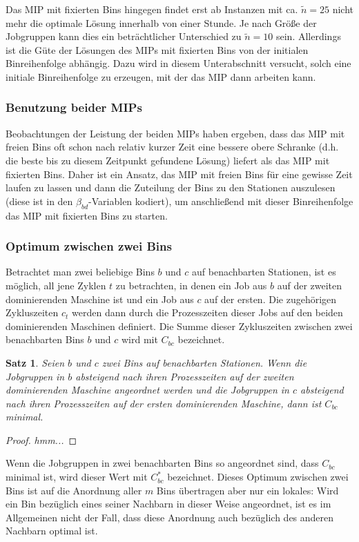 \documentclass{scrreprt}
\newtheorem{satz}{Satz}
\begin{document}
Das MIP mit fixierten Bins hingegen findet erst ab Instanzen mit ca. $\tilde{n}=25$ nicht mehr die optimale Lösung innerhalb von einer Stunde.
Je nach Größe der Jobgruppen kann dies ein beträchtlicher Unterschied zu $\tilde{n}=10$ sein. 
Allerdings ist die Güte der Lösungen des MIPs mit fixierten Bins von der initialen Binreihenfolge abhängig.
Dazu wird in diesem Unterabschnitt versucht, solch eine initiale Binreihenfolge zu erzeugen, mit der das MIP dann arbeiten kann.

\subsubsection{Benutzung beider MIPs}
Beobachtungen der Leistung der beiden MIPs haben ergeben, dass das MIP mit freien Bins oft schon nach relativ kurzer Zeit eine bessere obere Schranke
(d.h. die beste bis zu diesem Zeitpunkt gefundene Lösung) liefert als das MIP mit fixierten Bins.
Daher ist ein Ansatz, das MIP mit freien Bins für eine gewisse Zeit laufen zu lassen und dann die Zuteilung der Bins zu den Stationen
auszulesen (diese ist in den $\beta_{bd}$-Variablen kodiert), um anschließend mit dieser Binreihenfolge das MIP mit fixierten Bins zu starten.


\subsubsection{Optimum zwischen zwei Bins}
Betrachtet man zwei beliebige Bins $b$ und $c$ auf benachbarten Stationen, ist es möglich, 
all jene Zyklen $t$ zu betrachten, in denen ein Job aus $b$ auf der zweiten dominierenden Maschine ist und ein Job aus $c$ auf der ersten.
Die zugehörigen Zykluszeiten $c_t$ werden dann durch die Prozesszeiten dieser Jobs auf den beiden dominierenden Maschinen definiert.%
Die Summe dieser Zykluszeiten zwischen zwei benachbarten Bins $b$ und $c$ wird mit $C_{bc}$ bezeichnet.
\begin{satz}
    Seien $b$ und $c$ zwei Bins auf benachbarten Stationen.
    Wenn die Jobgruppen in $b$ absteigend nach ihren Prozesszeiten auf der zweiten dominierenden Maschine angeordnet werden
    und die Jobgruppen in $c$ absteigend nach ihren Prozesszeiten auf der ersten dominierenden Maschine,
    dann ist $C_{bc}$ minimal.
\end{satz}
\begin{proof}
    \textit{hmm...}
\end{proof}
Wenn die Jobgruppen in zwei benachbarten Bins so angeordnet sind, dass $C_{bc}$ minimal ist, wird dieser Wert mit $C_{bc}^*$ bezeichnet.
Dieses Optimum zwischen zwei Bins ist auf die Anordnung aller $m$ Bins übertragen aber nur ein lokales:
Wird ein Bin bezüglich eines seiner Nachbarn in dieser Weise angeordnet, ist es im Allgemeinen nicht der Fall,
dass diese Anordnung auch bezüglich des anderen Nachbarn optimal ist.
\end{document}
